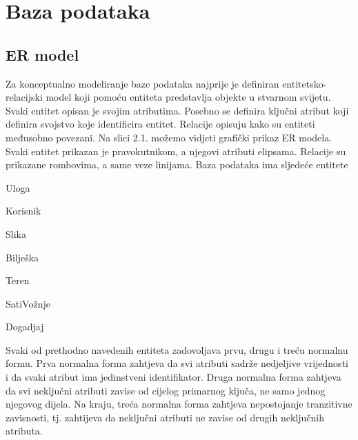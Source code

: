 \chapter{Baza podataka}


  
\section{ER model}

Za konceptualno modeliranje baze podataka najprije je definiran entitetsko-relacijski model koji pomoću entiteta predstavlja objekte u stvarnom svijetu. Svaki entitet opisan je svojim atributima. Posebno se definira ključni atribut koji definira svojstvo koje identificira entitet. Relacije opisuju kako su entiteti međusobno povezani. Na slici 2.1. možemo vidjeti grafički prikaz ER modela. Svaki entitet prikazan je pravokutnikom, a njegovi atributi elipsama. Relacije su prikazane rombovima, a same veze linijama. Baza podataka ima sljedeće entitete


\begin{packed_item}
			\item Uloga
                \item Korisnik
                \item Slika
			\item Bilješka
			\item Teren
			\item SatiVožnje
			\item Dogadjaj
		\end{packed_item}

\noindent Svaki od prethodno  navedenih entiteta zadovoljava prvu, drugu i treću normalnu formu. Prva normalna forma zahtjeva da svi atributi sadrže nedjeljive vrijednosti i da svaki atribut ima jedinstveni identifikator. Druga normalna forma zahtjeva da svi neključni atributi zavise od cijelog primarnog ključa, ne samo jednog njegovog dijela. Na kraju, treća normalna forma zahtjeva nepostojanje tranzitivne zavisnosti, tj. zahtijeva da neključni atributi ne zavise od drugih neključnih atributa.



